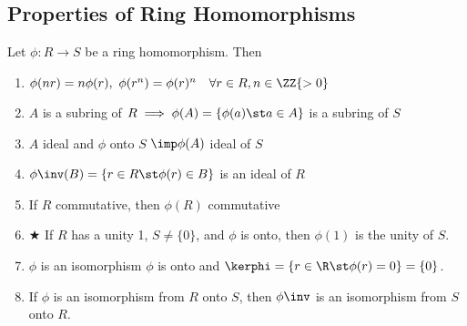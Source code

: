 \subsection{Properties of Ring Homomorphisms}
\begin{theorem}
  Let \( \phi: R\to S \) be a ring homomorphism. Then
  \begin{enumerate}
    \item \( \phi(nr) = n\phi(r),\  \phi(r^n) = \phi(r)^n \quad \forall r\in R, n\in \ZZ{>0} \)
    \item \( A \) is a subring of \( R \implies  \phi(A) = \{\phi(a) \st a\in A\} \) is a subring of \( S \)
    \item \( A \) ideal and \( \phi \) onto \( S \) \( \imp \phi(A) \) ideal of \( S \)
    \item \( \phi\inv(B) = \{r\in R \st \phi(r) \in B \} \) is an ideal of \( R \)
    \item If \( R \) commutative, then \( \phi(R) \) commutative
    \item \hspace{-2.75em}$\bigstar$\hspace{1.5em} If \( R \) has a unity 1, \( S\neq \{0\} \), and \( \phi \) is onto, then \( \phi(1) \) is the unity of \( S \).
    \item \( \phi \) is an isomorphism \iff \( \phi \) is onto and \( \kerphi = \{r\in\R \st \phi(r) = 0\} = \{0\} \).
    \item If \( \phi \) is an isomorphism from \( R \) onto \( S \), then \( \phi\inv \) is an isomorphism from \( S \) onto \( R \).
  \end{enumerate}
\end{theorem}